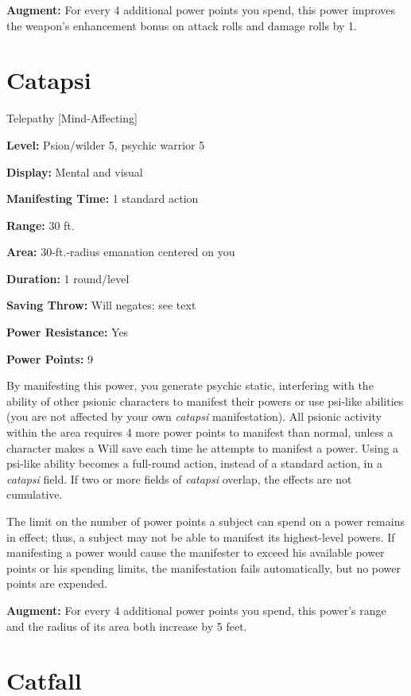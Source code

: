 \documentclass{article}
\begin{document}
\textbf{Augment:} For every 4 additional power points you spend, this power improves 
the weapon's enhancement bonus on attack rolls and damage rolls by 1.

\vspace{12pt}
\section*{Catapsi}

Telepathy [Mind-Affecting]

\textbf{Level:} Psion/wilder 5, psychic warrior 5

\textbf{Display:} Mental and visual

\textbf{Manifesting Time:} 1 standard action

\textbf{Range:} 30 ft.

\textbf{Area:} 30-ft.-radius emanation centered on you

\textbf{Duration:} 1 round/level

\textbf{Saving Throw:} Will negates; see text

\textbf{Power Resistance:} Yes

\textbf{Power Points:} 9

By manifesting this power, you generate psychic static, interfering with the ability 
of other psionic characters to manifest their powers or use psi-like abilities 
(you are not affected by your own \textit{catapsi }manifestation). All psionic 
activity within the area requires 4 more power points to manifest than normal, 
unless a character makes a Will save each time he attempts to manifest a power. 
Using a psi-like ability becomes a full-round action, instead of a standard action, 
in a \textit{catapsi }field. If two or more fields of \textit{catapsi }overlap, 
the effects are not cumulative.

The limit on the number of power points a subject can spend on a power remains 
in effect; thus, a subject may not be able to manifest its highest-level powers. 
If manifesting a power would cause the manifester to exceed his available power 
points or his spending limits, the manifestation fails automatically, but no power 
points are expended.

\textbf{Augment:} For every 4 additional power points you spend, this power's range 
and the radius of its area both increase by 5 feet.

\vspace{12pt}
\section*{Catfall}
\end{document}
